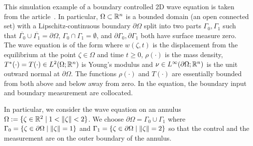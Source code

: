 \documentclass[11pt, a4paper]{amsart}
\theoremstyle{definition}
\numberwithin{equation}{section}
\begin{document}
This simulation example of a boundary controlled 2D wave equation
  is taken from the article~\cite{HumKur19}. In particular, 
  $\Omega\subset{\mathbb{R}}^n$ is a bounded domain (an open connected set) with a Lipschitz-continuous boundary $\partial\Omega$ split into two parts $\Gamma_0,\Gamma_1$ such that $\overline{\Gamma_0}\cup\overline{\Gamma_1}=\partial\Omega$, $\Gamma_0\cap\Gamma_1=\emptyset$, and $\partial\Gamma_0,\partial\Gamma_1$ both have surface measure zero. The wave equation is of the form
  where $w(\zeta,t)$ is the displacement from the equilibrium at the point $\zeta\in\Omega$ and time $t\geq0$, $\rho(\cdot)$ is the mass density, $T^*(\cdot)=T(\cdot)\in L^2(\Omega;{\mathbb{R}}^n)$ is Young's modulus and $\nu\in L^\infty(\partial\Omega;{\mathbb{R}}^n)$ is the unit outward normal at $\partial\Omega$. The functions $\rho(\cdot)$ and $T(\cdot)$ are essentially bounded from both above and below away from zero. In the equation, the boundary input and boundary measurement are collocated.

  In particular, we consider the wave equation on an annulus 
  $\Omega := \{\zeta \in \mathbb{R}^2 \mid 1 < \|\zeta\| < 2\}$. 
  We choose $\partial \Omega = \Gamma_0 \cup \Gamma_1$ where $\Gamma_0 = \{\zeta \in \partial\Omega \mid \|\zeta\| = 1\}$ and $\Gamma_1 = \{\zeta \in \partial\Omega \mid \|\zeta\| = 2\}$ so that the control and the measurement are on the outer boundary of the annulus.
\end{document}
